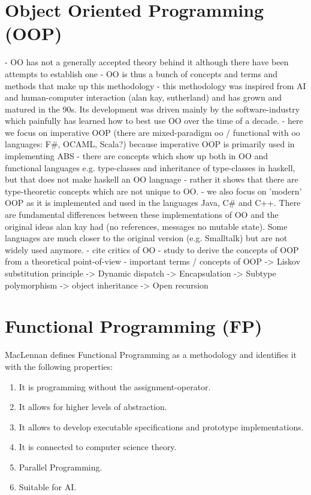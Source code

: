 \section{Object Oriented Programming (OOP)}
- OO has not a generally accepted theory behind it although there have been attempts to establish one \cite{abadi_theory_1996}
- OO is thus a bunch of concepts and terms and methods that make up this methodology - this methodology was inspired from AI and human-computer interaction (alan kay, sutherland) and has grown and matured in the 90s. Its development was driven mainly by the software-industry which painfully has learned how to best use OO over the time of a decade.
- here we focus on imperative OOP (there are mixed-paradigm oo / functional with oo languages: F\#, OCAML, Scala?) because imperative OOP is primarily used in implementing ABS
- there are concepts which show up both in OO and functional languages e.g. type-classes and inheritance of type-classes in haskell, but that does not make haskell an OO language - rather it shows that there are type-theoretic concepts which are not unique to OO.
- we also focus on 'modern' OOP as it is implemented and used in the languages Java, C\# and C++. There are fundamental differences between these implementations of OO and the original ideas alan kay had (no references, messages no mutable state). Some languages are much closer to the original version (e.g. Smalltalk) but are not widely used anymore.
- cite critics of OO
- study \cite{abadi_theory_1996} to derive the concepts of OOP from a theoretical point-of-view
- important terms / concepts of OOP
	-> Liskov substitution principle
	-> Dynamic dispatch
	-> Encapsulation
	-> Subtype polymorphism
	-> object inheritance 
	-> Open recursion
	
\section{Functional Programming (FP)}
MacLennan \cite{maclennan_functional_1990} defines Functional Programming as a methodology and identifies it with the following properties:

\begin{enumerate}
	\item It is programming without the assignment-operator.
	\item It allows for higher levels of abstraction.
	\item It allows to develop executable specifications and prototype implementations.
	\item It is connected to computer science theory.
	\item Parallel Programming.
	\item Suitable for AI.
\end{enumerate}

